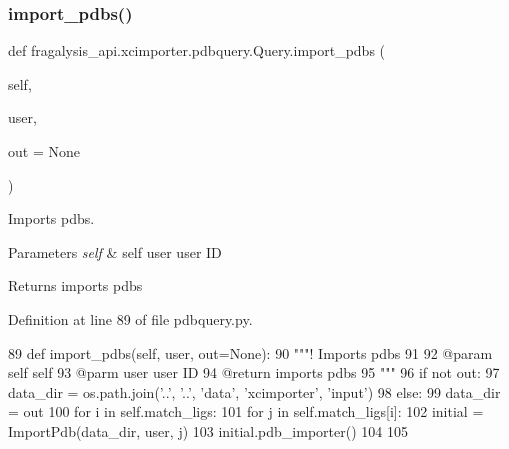 \subsubsection{\texorpdfstring{import\+\_\+pdbs()}{import\_pdbs()}}
{\footnotesize\ttfamily def fragalysis\+\_\+api.\+xcimporter.\+pdbquery.\+Query.\+import\+\_\+pdbs (\begin{DoxyParamCaption}\item[{}]{self,  }\item[{}]{user,  }\item[{}]{out = {\ttfamily None} }\end{DoxyParamCaption})}



Imports pdbs. 


\begin{DoxyParams}{Parameters}
{\em self} & self  user user ID \\
\hline
\end{DoxyParams}
\begin{DoxyReturn}{Returns}
imports pdbs 
\end{DoxyReturn}


Definition at line 89 of file pdbquery.\+py.


\begin{DoxyCode}
89     \textcolor{keyword}{def }import\_pdbs(self, user, out=None):
90         \textcolor{stringliteral}{"""! Imports pdbs}
91 \textcolor{stringliteral}{}
92 \textcolor{stringliteral}{        @param self self}
93 \textcolor{stringliteral}{        @parm user user ID }
94 \textcolor{stringliteral}{        @return imports pdbs}
95 \textcolor{stringliteral}{        """}
96         \textcolor{keywordflow}{if} \textcolor{keywordflow}{not} out:
97             data\_dir = os.path.join(\textcolor{stringliteral}{'..'}, \textcolor{stringliteral}{'..'}, \textcolor{stringliteral}{'data'}, \textcolor{stringliteral}{'xcimporter'}, \textcolor{stringliteral}{'input'})
98         \textcolor{keywordflow}{else}:
99             data\_dir = out
100         \textcolor{keywordflow}{for} i \textcolor{keywordflow}{in} self.match\_ligs:
101             \textcolor{keywordflow}{for} j \textcolor{keywordflow}{in} self.match\_ligs[i]:
102                 initial = ImportPdb(data\_dir, user, j)
103                 initial.pdb\_importer()
104 
105 
\end{DoxyCode}
\mbox{\label{classfragalysis__api_1_1xcimporter_1_1pdbquery_1_1_query_a36dfa365ad219285d470107eba4e7080}} 
